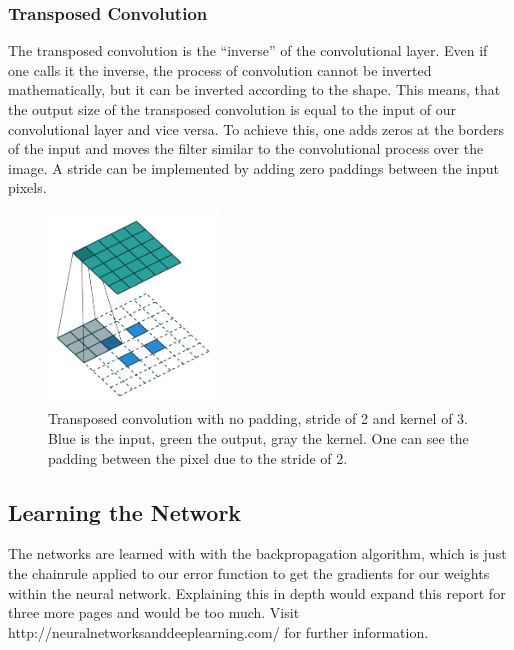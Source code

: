 \documentclass[
     11pt,         %
     a4paper,      %
     oneside,
     ]{article}
\begin{document}
\subsubsection{Transposed Convolution}
The transposed convolution is the \enquote{inverse} of the convolutional layer. Even if one calls it the inverse, the process of convolution cannot be inverted mathematically, but it can be inverted according to the shape.
This means, that the output size of the transposed convolution is equal to the input of our convolutional layer and vice versa. To achieve this, one adds zeros at the borders of the input and moves the filter similar to the convolutional process over the image. A stride can be implemented by adding zero paddings between the input pixels.
\begin{figure}[H]
  \begin{center}
    \includegraphics[width=0.4\textwidth]{images/tConv.png}
    \caption{Transposed convolution with no padding, stride of 2 and kernel of 3. Blue is the input, green the output, gray the kernel. One can see the padding between the pixel due to the stride of 2.}
    \label{fig:tConv}
  \end{center}
\end{figure}

\subsection{Learning the Network}
The networks are learned with with the backpropagation algorithm, which is just the chainrule applied to our error function to get the gradients for our weights within the neural network. Explaining this in depth would expand this report for three more pages and would be too much. Visit http://neuralnetworksanddeeplearning.com/ for further information.
\end{document}
